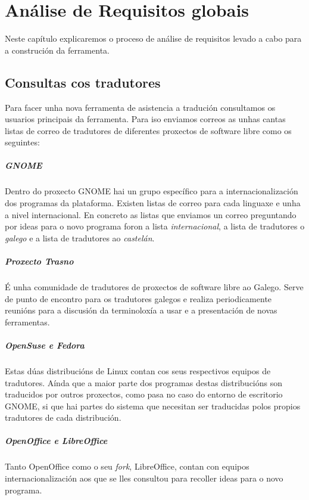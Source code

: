 \chapter[Análise de Requisitos]{Análise de Requisitos globais}

Neste capítulo explicaremos o proceso de análise de requisitos levado a cabo para a construción da ferramenta.

\section{Consultas cos tradutores}
Para facer unha nova ferramenta de asistencia a tradución consultamos os usuarios principais da ferramenta. Para iso enviamos correos as unhas cantas listas de correo de tradutores de diferentes proxectos de software libre como os seguintes:

\paragraph{GNOME} Dentro do proxecto GNOME hai un grupo específico para a internacionalización dos programas da plataforma. Existen listas de correo para cada linguaxe e unha a nivel internacional. En concreto as listas que enviamos un correo preguntando por ideas para o novo programa foron a lista \emph{internacional}, a lista de tradutores o \emph{galego} e a lista de tradutores ao \emph{castelán}.

\paragraph{Proxecto Trasno} É unha comunidade de tradutores de proxectos de software libre ao Galego. Serve de punto de encontro para os tradutores galegos e realiza periodicamente reunións para a discusión da terminoloxía a usar e a presentación de novas ferramentas.

\paragraph{OpenSuse e Fedora} Estas dúas distribucións de Linux contan cos seus respectivos equipos de tradutores. Aínda que a maior parte dos programas destas distribucións son traducidos por outros proxectos, como pasa no caso do entorno de escritorio GNOME, si que hai partes do sistema que necesitan ser traducidas polos propios tradutores de cada distribución.

\paragraph{OpenOffice e LibreOffice} Tanto OpenOffice como o seu \emph{fork}, LibreOffice, contan con equipos internacionalización aos que se lles consultou para recoller ideas para o novo programa.

